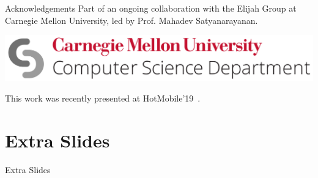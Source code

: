 \documentclass[aspectratio=1610]{beamer}
\begin{document}
\begin{frame}
    \begin{block}{Acknowledgements}
        Part of an ongoing collaboration with the Elijah Group at Carnegie Mellon University, led by Prof. Mahadev Satyanarayanan.\\
        \vspace{3em}
        \begin{center}
            \includegraphics[width=.7\linewidth]{img/cmu_csd.png}\\
        \end{center}
        \vspace{3em}
        This work was recently presented at HotMobile'19~\autocite{Olguin:EdgeDroid2019}.
    \end{block}
\end{frame}


\startpage
\section{Extra Slides}
\begin{frame}{}
    \begin{center}
        \Large Extra Slides
    \end{center}
\end{frame}
\end{document}
